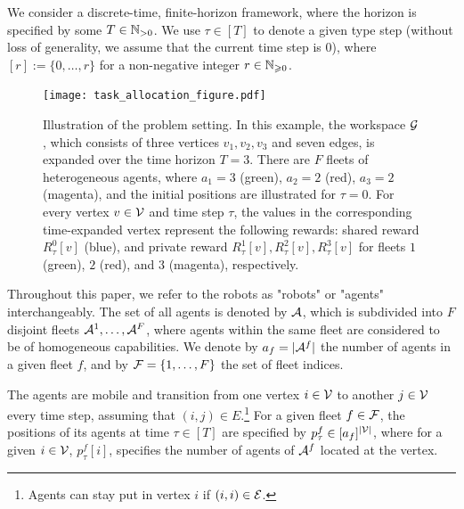 \documentclass[conference]{IEEEtran}
\begin{document}
We consider a discrete-time, finite-horizon framework, where the horizon is specified by some $T\in \mathbb{N}_{>0}$. We use $\tau\in [T]$ to denote a given type step (without loss of generality, we assume that the current time step is $0$), where $[r]:=\{0,\ldots,r\}$ for a non-negative integer $r\in \mathbb{N}_{\geqslant 0}$.


\begin{figure}[!ht]
    \centering
    \texttt{[image: task\_allocation\_figure.pdf]}
    \caption{Illustration of the problem setting. In this example, the workspace $\mathcal{G}$, which consists of three vertices $v_1, v_2, v_3$ and seven edges, is expanded over the time horizon $T=3$. There are $F$ fleets of heterogeneous agents, where $a_1=3$ (green), $a_2=2$ (red), $a_3=2$ (magenta), and the initial positions are illustrated for $\tau=0$. For every vertex $v\in \mathcal{V}$ and time step $\tau$, the values in the corresponding time-expanded vertex represent the following rewards: shared reward $R^0_\tau[v]$ (blue), and private reward $R^1_\tau[v], R^2_\tau[v], R^3_\tau[v]$ for fleets $1$ (green), $2$ (red), and $3$ (magenta), respectively.}
    \label{fig:workspace}
\end{figure}

Throughout this paper, we refer to the robots as "robots" or "agents" interchangeably. The set of all agents is denoted by $\mathcal{A}$, which is subdivided into $F$ disjoint fleets $\mathcal{A}^1,\ldots, \mathcal{A}^F$, where agents within the same fleet are considered to be of homogeneous capabilities.
We denote by $a_f=|\mathcal{A}^f|$ the number of agents in a given fleet $f$, and by $\mathcal{F}=\{1,\ldots,F\}$ the set of fleet indices. 

The agents are mobile and transition from one vertex $i\in \mathcal{V}$ to another $j\in \mathcal{V}$ every time step, assuming that $(i,j)\in E$.\footnote{Agents can stay put in vertex $i$ if $(i,i)\in \mathcal{E}$.}
For a given fleet $f\in \mathcal{F}$, the positions of its agents at time $\tau\in [T]$ are specified by $p^f_\tau\in [a_f]^{ |\mathcal{V}|}$, where for a given $i\in \mathcal{V}$, $p^f_\tau[i]$, specifies the number of agents of $\mathcal{A}^f$ located at the vertex. %
\end{document}
